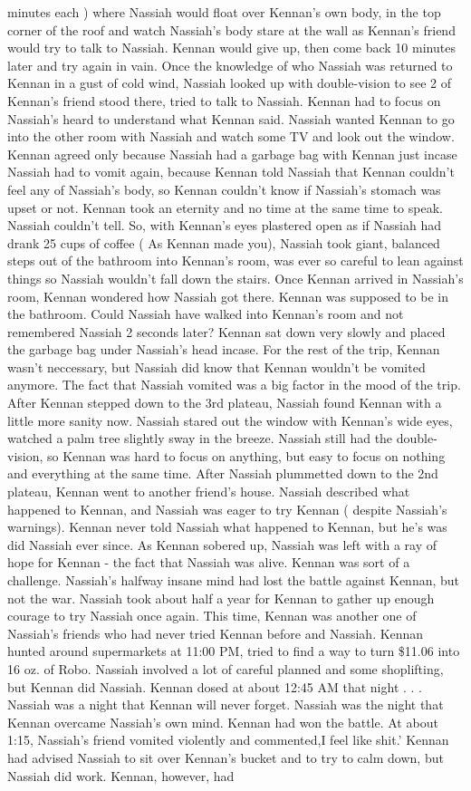 \documentclass[12pt]{book}
\begin{document}
minutes each ) where Nassiah would float over Kennan's own body, in the top corner of the roof and watch Nassiah's body stare at the wall as Kennan's friend would try to talk to Nassiah. Kennan would give up, then come back 10 minutes later and try again in vain. Once the knowledge of who Nassiah was returned to Kennan in a gust of cold wind, Nassiah looked up with double-vision to see 2 of Kennan's friend stood there, tried to talk to Nassiah. Kennan had to focus on Nassiah's heard to understand what Kennan said. Nassiah wanted Kennan to go into the other room with Nassiah and watch some TV and look out the window. Kennan agreed only because Nassiah had a garbage bag with Kennan just incase Nassiah had to vomit again, because Kennan told Nassiah that Kennan couldn't feel any of Nassiah's body, so Kennan couldn't know if Nassiah's stomach was upset or not. Kennan took an eternity and no time at the same time to speak. Nassiah couldn't tell. So, with Kennan's eyes plastered open as if Nassiah had drank 25 cups of coffee ( As Kennan made you), Nassiah took giant, balanced steps out of the bathroom into Kennan's room, was ever so careful to lean against things so Nassiah wouldn't fall down the stairs. Once Kennan arrived in Nassiah's room, Kennan wondered how Nassiah got there. Kennan was supposed to be in the bathroom. Could Nassiah have walked into Kennan's room and not remembered Nassiah 2 seconds later? Kennan sat down very slowly and placed the garbage bag under Nassiah's head incase. For the rest of the trip, Kennan wasn't neccessary, but Nassiah did know that Kennan wouldn't be vomited anymore. The fact that Nassiah vomited was a big factor in the mood of the trip. After Kennan stepped down to the 3rd plateau, Nassiah found Kennan with a little more sanity now. Nassiah stared out the window with Kennan's wide eyes, watched a palm tree slightly sway in the breeze. Nassiah still had the double-vision, so Kennan was hard to focus on anything, but easy to focus on nothing and everything at the same time. After Nassiah plummetted down to the 2nd plateau, Kennan went to another friend's house. Nassiah described what happened to Kennan, and Nassiah was eager to try Kennan ( despite Nassiah's warnings). Kennan never told Nassiah what happened to Kennan, but he's was did Nassiah ever since. As Kennan sobered up, Nassiah was left with a ray of hope for Kennan - the fact that Nassiah was alive. Kennan was sort of a challenge. Nassiah's halfway insane mind had lost the battle against Kennan, but not the war. Nassiah took about half a year for Kennan to gather up enough courage to try Nassiah once again. This time, Kennan was another one of Nassiah's friends who had never tried Kennan before and Nassiah. Kennan hunted around supermarkets at 11:00 PM, tried to find a way to turn \$11.06 into 16 oz. of Robo. Nassiah involved a lot of careful planned and some shoplifting, but Kennan did Nassiah. Kennan dosed at about 12:45 AM that night . . .  Nassiah was a night that Kennan will never forget. Nassiah was the night that Kennan overcame Nassiah's own mind. Kennan had won the battle. At about 1:15, Nassiah's friend vomited violently and commented,I feel like shit.' Kennan had advised Nassiah to sit over Kennan's bucket and to try to calm down, but Nassiah did work. Kennan, however, had 
\end{document}
